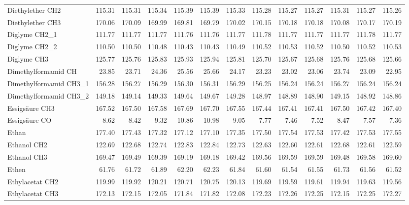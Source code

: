 \begin{table}[ht!]
{\begin{tabular}{lrrrrrrrrrrrr}
    Diethylether CH2 & 115.31 & 115.31 & 115.34 & 115.39 & 115.39 & 115.33 & 115.28 & 115.27 & 115.27 & 115.31 & 115.27 & 115.26 \\
    Diethylether CH3 & 170.06 & 170.09 & 169.99 & 169.81 & 169.79 & 170.02 & 170.15 & 170.18 & 170.18 & 170.08 & 170.17 & 170.19 \\
    Diglyme CH2\_1 & 111.77 & 111.77 & 111.77 & 111.76 & 111.76 & 111.77 & 111.78 & 111.77 & 111.77 & 111.77 & 111.78 & 111.77 \\
    Diglyme CH2\_2 & 110.50 & 110.50 & 110.48 & 110.43 & 110.43 & 110.49 & 110.52 & 110.53 & 110.52 & 110.50 & 110.52 & 110.53 \\
    Diglyme CH3 & 125.77 & 125.76 & 125.83 & 125.93 & 125.94 & 125.81 & 125.70 & 125.67 & 125.68 & 125.76 & 125.68 & 125.66 \\
    Dimethylformamid CH & 23.85 & 23.71 & 24.36 & 25.56 & 25.66 & 24.17 & 23.23 & 23.02 & 23.06 & 23.74 & 23.09 & 22.95 \\
    Dimethylformamid CH3\_1 & 156.28 & 156.27 & 156.29 & 156.30 & 156.31 & 156.29 & 156.25 & 156.24 & 156.24 & 156.27 & 156.24 & 156.24 \\
    Dimethylformamid CH3\_2 & 149.18 & 149.14 & 149.33 & 149.64 & 149.67 & 149.28 & 148.97 & 148.89 & 148.90 & 149.15 & 148.92 & 148.86 \\
    Essigsäure CH3 & 167.52 & 167.50 & 167.58 & 167.69 & 167.70 & 167.55 & 167.44 & 167.41 & 167.41 & 167.50 & 167.42 & 167.40 \\
    Essigsäure CO & 8.62  & 8.42  & 9.32  & 10.86 & 10.98 & 9.05  & 7.77  & 7.46  & 7.52  & 8.47  & 7.57  & 7.36 \\
    Ethan & 177.40 & 177.43 & 177.32 & 177.12 & 177.10 & 177.35 & 177.50 & 177.54 & 177.53 & 177.42 & 177.53 & 177.55 \\
    Ethanol CH2 & 122.69 & 122.68 & 122.74 & 122.83 & 122.84 & 122.73 & 122.63 & 122.60 & 122.61 & 122.68 & 122.61 & 122.59 \\
    Ethanol CH3 & 169.47 & 169.49 & 169.39 & 169.19 & 169.18 & 169.42 & 169.56 & 169.59 & 169.59 & 169.48 & 169.58 & 169.60 \\
    Ethen & 61.76 & 61.72 & 61.89 & 62.20 & 62.23 & 61.84 & 61.60 & 61.54 & 61.55 & 61.73 & 61.56 & 61.52 \\
    Ethylacetat CH2 & 119.99 & 119.92 & 120.21 & 120.71 & 120.75 & 120.13 & 119.69 & 119.59 & 119.61 & 119.94 & 119.63 & 119.56 \\
    Ethylacetat CH3 & 172.13 & 172.15 & 172.05 & 171.84 & 171.82 & 172.08 & 172.23 & 172.26 & 172.25 & 172.15 & 172.25 & 172.27 \\

\end{tabular}}
\end{table}
